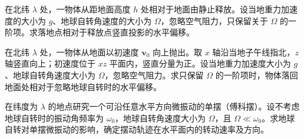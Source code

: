 \noindent\begin{minipage}{\textwidth}
在北纬 $\lambda$ 处，一物体从距地面高度 $h$ 处相对于地面由静止释放。设当地重力加速度的大小为 $g$、地球自转角速度的大小为 $\Omega$，忽略空气阻力，只保留关于 $\Omega$ 的一阶项。求落地点相对于释放点竖直投影的水平偏移。
\end{minipage}\par\vfill
\newpage
\noindent\begin{minipage}{\textwidth}
在北纬 $\lambda$ 处，一物体从地面以初速度 $\mathbf v_0$ 向上抛出。取 $x$ 轴沿当地子午线指北，$z$ 轴竖直向上；初速度位于 $xz$ 平面内，竖直分量为正。设当地重力加速度大小为 $g$、地球自转角速度大小为 $\Omega$，忽略空气阻力。求只保留 $\Omega$ 的一阶项时，物体落回地面处相对于忽略地球自转时的水平偏移。
\end{minipage}\par\vfill
\noindent\begin{minipage}{\textwidth}
在纬度为 $\lambda$ 的地点研究一个可沿任意水平方向微振动的单摆（傅科摆）。设不考虑地球自转时的振动角频率为 $\omega_0$，地球自转角速度大小为 $\Omega$，且 $\Omega\ll\omega_0$。求地球自转对单摆微振动的影响，确定摆动轨迹在水平面内的转动速率及方向。
\end{minipage}\par\vfill
